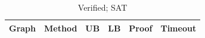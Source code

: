 \begin{table}[htbp]
\centering
\caption{Verified; SAT}
\label{tab:p2a-SAT-results}
\begin{tabular}{llllll}
\hline
Graph & Method & UB & LB & Proof & Timeout \\
\hline
\hline
\end{tabular}
\end{table}
